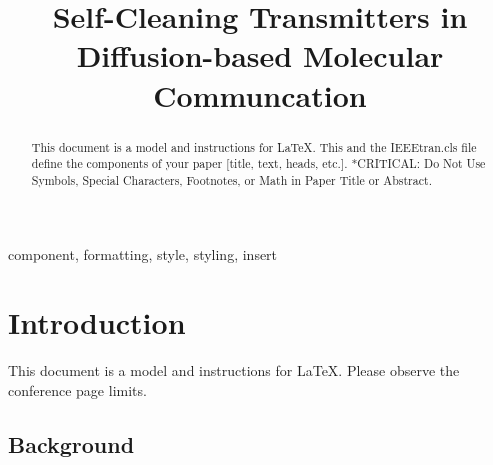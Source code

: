 \documentclass[conference]{IEEEtran}
\begin{document}
\title{Self-Cleaning Transmitters in Diffusion-based Molecular Communcation\\
}

\author{
\and
{}
}

\maketitle

\begin{abstract}
This document is a model and instructions for \LaTeX.
This and the IEEEtran.cls file define the components of your paper [title, text, heads, etc.]. *CRITICAL: Do Not Use Symbols, Special Characters, Footnotes, 
or Math in Paper Title or Abstract.
\end{abstract}

\begin{IEEEkeywords}
component, formatting, style, styling, insert
\end{IEEEkeywords}

\section{Introduction}
This document is a model and instructions for \LaTeX.
Please observe the conference page limits. 

\subsection{Background}
\end{document}
